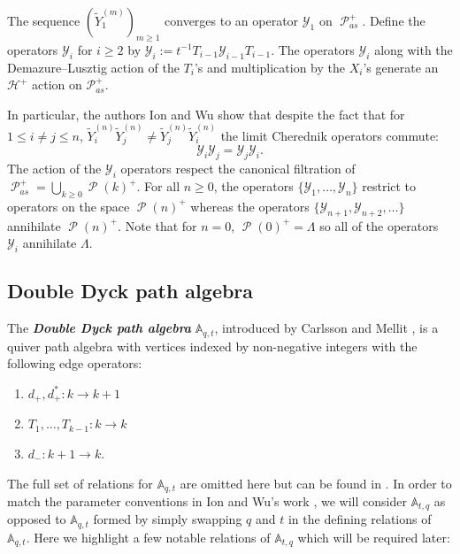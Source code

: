 \documentclass[ALCO,Unicode]{cedram}
\newcommand{\y}{{ \mathscr{Y} }}
\DeclareMathOperator{\sP}{\mathscr{P} }
\begin{document}
\begin{thm}\label{deformed Y's converge}
    The sequence $(\widetilde{Y}_1^{(m)})_{m \geq 1}$ converges to an operator $\mathscr{Y}_1$ on $\sP_{as}^{+}$. Define the operators $\mathscr{Y}_i$ for $i \geq 2$ by $\y_{i}:= t^{-1}T_{i-1}\y_{i-1}T_{i-1}$. The operators $\mathscr{Y}_i$ along with the Demazure--Lusztig action of the $T_i$'s and multiplication by the $X_i$'s generate an $\mathscr{H}^{+}$ action on $\mathscr{P}_{as}^{+}$.
\end{thm}

In particular, the authors Ion and Wu show that despite the fact that for $1 \leq i \neq j \leq n$, $\widetilde{Y}_i^{(n)}\widetilde{Y}_j^{(n)} \neq \widetilde{Y}_j^{(n)}\widetilde{Y}_i^{(n)}$ the limit Cherednik operators commute: $$\mathscr{Y}_i\mathscr{Y}_j = \mathscr{Y}_j\mathscr{Y}_i .$$
The action of the $\y_i$ operators respect the canonical filtration of $\sP_{as}^{+} = \bigcup_{k\geq 0} \sP(k)^{+}$. For all $n\geq 0$, the operators $\{\y_1,\ldots,\y_n\}$ restrict to operators on the space $\sP(n)^{+}$ whereas the operators $\{\y_{n+1},\y_{n+2},\ldots\}$ annihilate $\sP(n)^{+}$. Note that for $n = 0$, $\sP(0)^{+} = \Lambda$ so all of the operators $\y_i$ annihilate $\Lambda$. 


\subsection{Double Dyck path algebra}
The \textbf{\textit{Double Dyck path algebra}} $\mathbb{A}_{q,t}$, introduced by Carlsson and Mellit \cite{CM_2015}, is a quiver path algebra with vertices indexed by non-negative integers with the following edge operators:
 
 \begin{center}
\begin{enumerate}
    \item $d_{+},d_{+}^{*}: k \rightarrow k+1$
    \item $T_1,\ldots,T_{k-1}: k \rightarrow k$
    \item $d_{-}: k+1 \rightarrow k.$
 \end{enumerate}
 \end{center}
 
 The full set of relations for $\mathbb{A}_{q,t}$ are omitted here but can be found in \cite{CM_2015}. In order to match the parameter conventions in Ion and Wu's work \cite{Ion_2022}, we will consider $\mathbb{A}_{t,q}$ as opposed to $\mathbb{A}_{q,t}$ formed by simply swapping $q$ and $t$ in the defining relations of $\mathbb{A}_{q,t}$. Here we highlight a few notable relations of $\mathbb{A}_{t,q}$ which will be required later:
  
\end{document}
